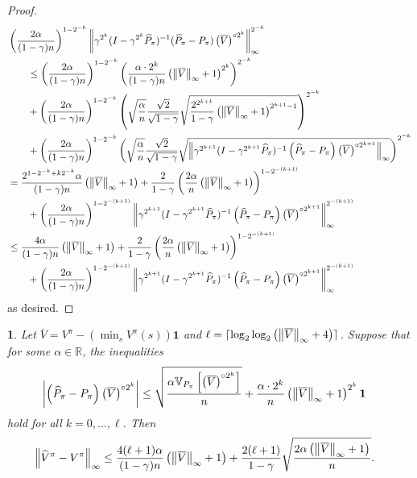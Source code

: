 \documentclass{article}
\theoremstyle{plain}
\theoremstyle{plain}
\newtheorem{lem}[thm]{\protect\lemmaname}
\theoremstyle{remark}
\theoremstyle{plain}
\theoremstyle{plain}
\providecommand{\lemmaname}{Lemma}
\newcommand{\R}{\mathbb{R}}
\newcommand{\Var}{\mathbb{V}}
\newcommand{\Phat}{\widehat{P}}
\newcommand{\Vhat}{\widehat{V}}
\newcommand{\one}{\mathbf{1}}
\newcommand{\Vc}{\overline{V}}
\begin{document}
\begin{proof}
\begin{align*}
         &\left(\frac{2\alpha}{(1-\gamma)n}\right)^{1-2^{-k}}\infnorm{ \gamma^{2^k}(I - \gamma^{2^k} \Phat_{\pi})^{-1} (\Phat_{\pi} - P_\pi) \left( \Vc \right)^{\circ 2^k} }^{2^{-k}}  \\
         &  \quad \quad \leq \left(\frac{2\alpha}{(1-\gamma)n}\right)^{1-2^{-k}} \left(\frac{ \alpha \cdot 2^k }{(1-\gamma) n}  \left( \infnorm{\Vc} + 1\right)^{2^k} \right)^{2^{-k}}  \\
         & \quad \quad + \left(\frac{2\alpha }{(1-\gamma)n}\right)^{1-2^{-k}} \left(\sqrt{\frac{\alpha}{n}}\frac{\sqrt{2}}{\sqrt{1-\gamma}}  \sqrt{\frac{2^{2^{k+1}}}{1-\gamma} \left(\infnorm{\Vc} + 1 \right)^{2^{k+1}-1} } \right)^{2^{-k}}  \\
        & \quad \quad + \left(\frac{2\alpha}{(1-\gamma)n}\right)^{1-2^{-k}} \left( \sqrt{\frac{\alpha}{n}} \frac{\sqrt{2}}{\sqrt{1-\gamma}}  \sqrt{\infnorm{\gamma^{2^{k+1}}(I - \gamma^{2^{k+1}} \Phat_{\pi})^{-1}\left(\Phat_\pi - P_\pi \right) \left(\Vc \right)^{\circ 2^{k+1}}}} \right)^{2^{-k}} \\
        & = \frac{2^{1-2^{-k} +k2^{-k}} \alpha}{(1-\gamma)n} \left( \infnorm{\Vc} + 1\right) + \frac{ 2 }{1-\gamma} \left(\frac{2\alpha }{n} \left( \infnorm{\Vc} + 1\right) \right)^{1-2^{-{(k+1)}}} \\
        & \quad \quad + \left(\frac{2\alpha}{(1-\gamma)n}\right)^{1-2^{-(k+1)}} \infnorm{\gamma^{2^{k+1}}(I - \gamma^{2^{k+1}} \Phat_{\pi})^{-1}\left(\Phat_\pi - P_\pi \right) \left(\Vc \right)^{\circ 2^{k+1}}}^{2^{-(k+1)}} \\
        & \leq \frac{4 \alpha}{(1-\gamma)n} \left( \infnorm{\Vc} + 1\right) + \frac{ 2 }{1-\gamma} \left(\frac{2\alpha }{n} \left( \infnorm{\Vc} + 1\right) \right)^{1-2^{-{(k+1)}}} \\
        & \quad \quad + \left(\frac{2\alpha}{(1-\gamma)n}\right)^{1-2^{-(k+1)}} \infnorm{\gamma^{2^{k+1}}(I - \gamma^{2^{k+1}} \Phat_{\pi})^{-1}\left(\Phat_\pi - P_\pi \right) \left(\Vc \right)^{\circ 2^{k+1}}}^{2^{-(k+1)}}
    \end{align*}
    as desired.
\end{proof}


\begin{lem}
\label{lem:DMDP_full_var_param_bound}
    Let $\Vc = V^{\pi} - \left(\min_s V^{\pi}(s)\right)\one$ and $\ell = \lceil\log_2 \log_2 \left( \infnorm{\Vc} + 4\right) \rceil$. Suppose that for some $\alpha \in \R$, the inequalities
    \begin{align*}
        \left| \left(\Phat_{\pi} - P_{\pi}\right) \left( \Vc \right)^{\circ 2^k} \right|
    &\leq \sqrt{\frac{\alpha   \Var_{P_{\pi}} \left[ \left(\Vc \right)^{\circ 2^k}  \right]    }{n }} + \frac{ \alpha \cdot 2^k }{n}  \left( \infnorm{\Vc} + 1\right)^{2^k}   \one 
    \end{align*}
    hold for all $k = 0, \dots, \ell$.
    Then
    \begin{align*}
    \infnorm{ \Vhat^\pi - V^\pi} &\leq \frac{4 (\ell + 1) \alpha}{(1-\gamma)n} \left( \infnorm{\Vc} + 1\right) + \frac{2(\ell + 1)}{1-\gamma} \sqrt{\frac{2 \alpha \left( \infnorm{\Vc} + 1\right)}{n}} .
\end{align*}
\end{lem}
\end{document}
